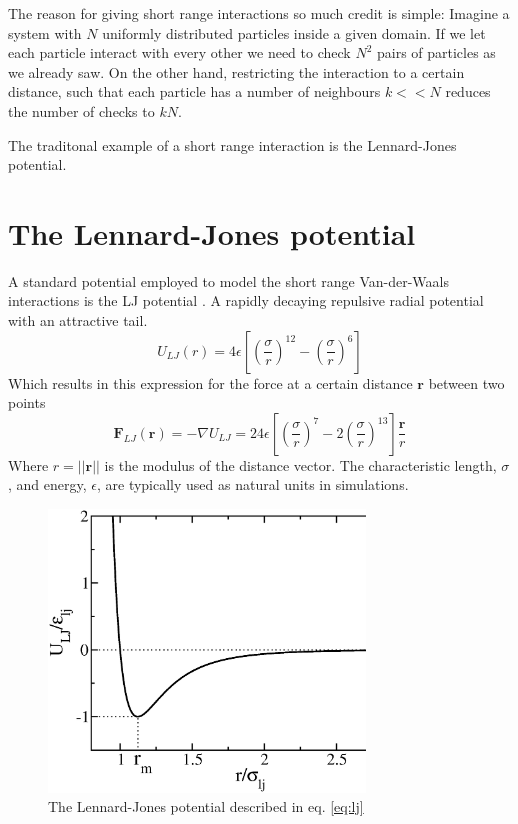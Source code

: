 \documentclass[ twoside,openright,titlepage,numbers=noenddot,%
headinclude,footinclude,cleardoublepage=empty,abstract=on,
BCOR=5mm,paper=a4,fontsize=11pt, dvipsnames
]{scrreprt}
\renewcommand{\vec}[1]{\bm{#1}}
\begin{document}
The reason for giving short range interactions so much credit is simple: Imagine a system with $N$ uniformly distributed particles inside a given domain. If we let each particle interact with every other we need to check $N^2$ pairs of particles as we already saw. On the other hand, restricting the interaction to a certain distance, such that each particle has a number of neighbours $k<<N$ reduces the number of checks to $kN$.

The traditonal example of a short range interaction is the Lennard-Jones potential.
\section{The Lennard-Jones potential}\label{sec:lj}
A standard potential employed to model the short range Van-der-Waals interactions is the \gls{LJ} potential \cite{lj}. A rapidly decaying repulsive radial potential with an attractive tail.
\begin{equation}
  \label{eq:lj}
  U_{LJ}(r) = 4 \epsilon \left[ \left(\frac{\sigma}{r}\right)^{12} - \left( \frac{\sigma}{r}\right)^6 \right] 
\end{equation}
Which results in this expression for the force at a certain distance $\vec{r}$ between two points
\begin{equation}
  \label{eq:ljf}
  \vec{F}_{LJ}(\vec{r}) = -\nabla U_{LJ} = 24 \epsilon \left[ \left(\frac{\sigma}{r}\right)^{7} - 2\left( \frac{\sigma}{r}\right)^{13} \right] \frac{\vec{r}}{r}
\end{equation}
Where $r = ||\vec{r}||$ is the modulus of the distance vector. The characteristic length, $\sigma$, and energy, $\epsilon$, are typically used as natural units in simulations.
\begin{figure}
  \centering
  \includegraphics[width=0.75\textwidth]{lj}
  \caption{The Lennard-Jones potential described in eq. \ref{eq:lj}}
  \label{fig:lj}
\end{figure}
\end{document}

